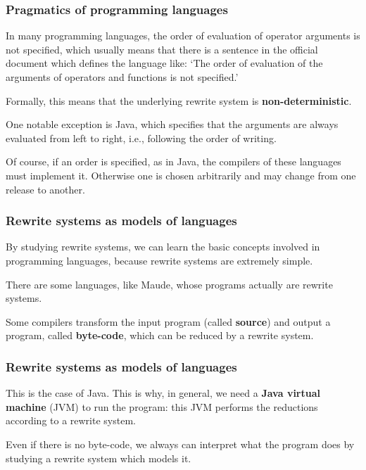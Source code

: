 \documentclass[compress,dvipdfmx]{beamer}
\newcommand{\Java}{\textsf{Java}\xspace}
\newcommand{\Maude}{\textsf{Maude}\xspace}
\begin{document}
%
\begin{frame}
  \frametitle{Pragmatics of programming languages}

  In many programming languages, the order of evaluation of operator
  arguments is not specified, which usually means that there is a
  sentence in the official document which defines the language like:
  `The order of evaluation of the arguments of operators and functions
  is not specified.'

  \bigskip

  Formally, this means that the underlying rewrite system is
  \textbf{non-deterministic}.

  \bigskip

  One notable exception is \Java, which specifies that the arguments
  are always evaluated from left to right, i.e., following the order
  of writing.

  \bigskip

  Of course, if an order is specified, as in \Java, the compilers of
  these languages must implement it. Otherwise one is chosen
  arbitrarily and may change from one release to another.

\end{frame}


%
\begin{frame}
  \frametitle{Rewrite systems as models of languages}

  By studying rewrite systems, we can learn the basic concepts
  involved in programming languages, because rewrite systems are
  extremely simple.

  \bigskip

  There are some languages, like \Maude, whose programs actually are
  rewrite systems.

  \bigskip

  Some compilers transform the input program (called \textbf{source})
  and output a program, called \textbf{byte-code}, which can be
  reduced by a rewrite system.

\end{frame}


%
\begin{frame}
  \frametitle{Rewrite systems as models of languages}

  This is the case of \Java. This is why, in general, we need a
  \textbf{\Java virtual machine} (JVM) to run the program: this JVM
  performs the reductions according to a rewrite system.

  \bigskip

  Even if there is no byte-code, we always can interpret what the
  program does by studying a rewrite system which models it.

\end{frame}
\end{document}
